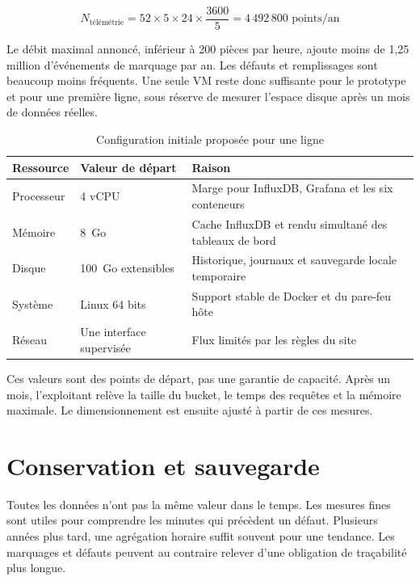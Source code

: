 \begin{equation}
N_{\text{télémétrie}} = 52 \times 5 \times 24 \times
\frac{3600}{5} = 4\,492\,800 \text{ points/an}
\end{equation}

Le débit maximal annoncé, inférieur à 200 pièces par heure, ajoute moins de
1,25 million d'événements de marquage par an. Les défauts et remplissages sont
beaucoup moins fréquents. Une seule VM reste donc suffisante pour le prototype
et pour une première ligne, sous réserve de mesurer l'espace disque après un
mois de données réelles.

\begin{table}[H]
\centering
\caption{Configuration initiale proposée pour une ligne}
\begin{tabularx}{\textwidth}{p{}p{}Y}
\toprule
Ressource & Valeur de départ & Raison \\
\midrule
Processeur & 4 vCPU & Marge pour InfluxDB, Grafana et les six conteneurs \\
Mémoire & 8~Go & Cache InfluxDB et rendu simultané des tableaux de bord \\
Disque & 100~Go extensibles & Historique, journaux et sauvegarde locale temporaire \\
Système & Linux 64 bits & Support stable de Docker et du pare-feu hôte \\
Réseau & Une interface supervisée & Flux limités par les règles du site \\
\bottomrule
\end{tabularx}
\end{table}

Ces valeurs sont des points de départ, pas une garantie de capacité. Après
un mois, l'exploitant relève la taille du bucket, le temps des requêtes et la
mémoire maximale. Le dimensionnement est ensuite ajusté à partir de ces
mesures.

\section{Conservation et sauvegarde}

Toutes les données n'ont pas la même valeur dans le temps. Les mesures fines
sont utiles pour comprendre les minutes qui précèdent un défaut. Plusieurs
années plus tard, une agrégation horaire suffit souvent pour une tendance. Les
marquages et défauts peuvent au contraire relever d'une obligation de
traçabilité plus longue.

